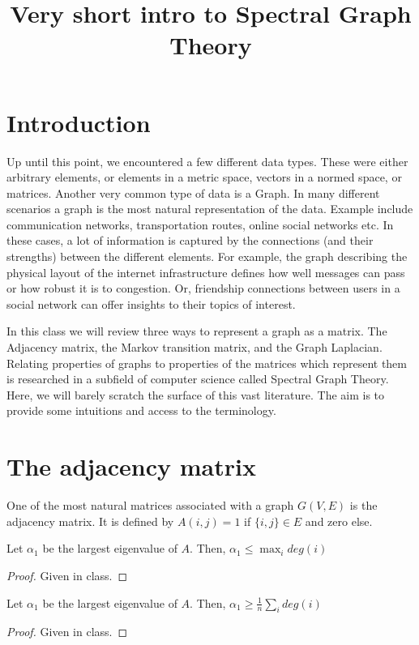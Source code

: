 \documentclass{article}
\title{Very short intro to Spectral Graph Theory}
\date{\nonumber}
\begin{document}
\maketitle

\section{Introduction}
Up until this point, we encountered a few different data types.
These were either arbitrary elements, or elements in a metric space, vectors in a normed space, or matrices.
Another very common type of data is a Graph.
In many different scenarios a graph is the most natural representation of the data.
Example include communication networks, transportation routes, online social networks etc.
In these cases, a lot of information is captured by the connections (and their strengths) between the different elements.
For example, the graph describing the physical layout of the internet infrastructure defines how well messages can pass
or how robust it is to congestion. 
Or, friendship connections between users in a social network can offer insights to their topics of interest.

In this class we will review three ways to represent a graph as a matrix.
The Adjacency matrix, the Markov transition matrix, and the Graph Laplacian.
Relating properties of graphs to properties of the matrices which represent them is 
researched in a subfield of computer science called Spectral Graph Theory.
Here, we will barely scratch the surface of this vast literature.
The aim is to provide some intuitions and access to the terminology.

\section{The adjacency matrix}
One of the most natural matrices associated with a graph $G(V,E)$ is the adjacency matrix.
It is defined by $A(i,j) = 1$ if $\{i,j\} \in E$ and zero else.

\begin{fact}
Let $\alpha_1$ be the largest eigenvalue of $A$. Then, $\alpha_1 \le \max_i deg(i)$ 
\end{fact}
\begin{proof}
Given in class.
\end{proof}

\begin{fact}
Let $\alpha_1$ be the largest eigenvalue of $A$. Then, $\alpha_1 \ge \frac{1}{n} \sum_{i}deg(i)$ 
\end{fact}
\begin{proof}
Given in class.
\end{proof}
\end{document}
